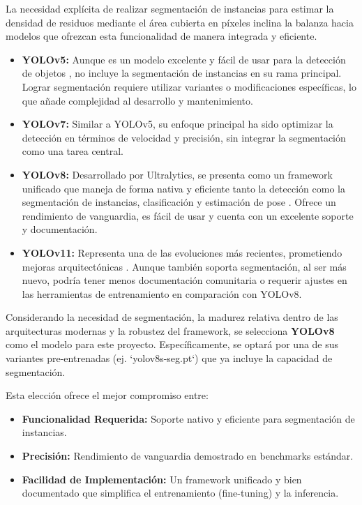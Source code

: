 La necesidad explícita de realizar segmentación de instancias para estimar la densidad de residuos mediante el área cubierta en píxeles inclina la balanza hacia modelos que ofrezcan esta funcionalidad de manera integrada y eficiente.

\begin{itemize}
    \item \textbf{YOLOv5:} Aunque es un modelo excelente y fácil de usar para la detección de objetos \cite{jocher2020yolov5}, no incluye la segmentación de instancias en su rama principal. Lograr segmentación requiere utilizar variantes o modificaciones específicas, lo que añade complejidad al desarrollo y mantenimiento.

    \item \textbf{YOLOv7:} Similar a YOLOv5, su enfoque principal ha sido optimizar la detección en términos de velocidad y precisión, sin integrar la segmentación como una tarea central.

    \item \textbf{YOLOv8:} Desarrollado por Ultralytics, se presenta como un framework unificado que maneja de forma nativa y eficiente tanto la detección como la segmentación de instancias, clasificación y estimación de pose \cite{ultralyticsYOLOv8}. Ofrece un rendimiento de vanguardia, es fácil de usar y cuenta con un excelente soporte y documentación.

    \item \textbf{YOLOv11:} Representa una de las evoluciones más recientes, prometiendo mejoras arquitectónicas \cite{sapkota2025yolo}. Aunque también soporta segmentación, al ser más nuevo, podría tener menos documentación comunitaria o requerir ajustes en las herramientas de entrenamiento en comparación con YOLOv8.
\end{itemize}

Considerando la necesidad de segmentación, la madurez relativa dentro de las arquitecturas modernas y la robustez del framework, se selecciona \textbf{YOLOv8} como el modelo para este proyecto. Específicamente, se optará por una de sus variantes pre-entrenadas (ej. `yolov8s-seg.pt`) que ya incluye la capacidad de segmentación.

Esta elección ofrece el mejor compromiso entre:
\begin{itemize}
    \item \textbf{Funcionalidad Requerida:} Soporte nativo y eficiente para segmentación de instancias.
    \item \textbf{Precisión:} Rendimiento de vanguardia demostrado en benchmarks estándar.
    \item \textbf{Facilidad de Implementación:} Un framework unificado y bien documentado que simplifica el entrenamiento (fine-tuning) y la inferencia.
\end{itemize}

